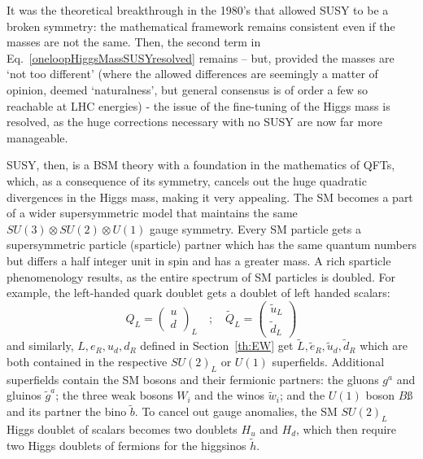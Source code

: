 It was the theoretical breakthrough in the 1980's that allowed \ac{SUSY} to be a broken symmetry: 
the mathematical framework remains consistent even if the masses are not the same.
Then, the second term in Eq.~\ref{oneloopHiggsMassSUSYresolved} remains -- 
but, provided the masses are `not too different' 
(where the allowed differences are seemingly a matter of opinion, deemed `naturalness', but general consensus is of order a few \TeV so reachable at \ac{LHC} energies) 
- the issue of the fine-tuning of the Higgs mass is resolved, as the huge corrections necessary with no \ac{SUSY} are now far more manageable.

\ac{SUSY}, then, is a \ac{BSM} theory with a foundation in the mathematics of \ac{QFT}s, which, as a consequence of its symmetry, cancels out the huge quadratic divergences in the Higgs mass, making it very appealing. 
The \ac{SM} becomes a part of a wider supersymmetric model that maintains the same $SU(3)\otimes SU(2) \otimes U(1)$ gauge symmetry. 
Every \ac{SM} particle gets a supersymmetric particle (sparticle) partner which has the same quantum numbers but differs a half integer unit in spin and has a greater mass. 
A rich sparticle phenomenology results, as the entire spectrum of \ac{SM} particles is doubled.
For example, the left-handed quark doublet gets a doublet of left handed scalars:
\begin{equation}
Q_{L} = \left(  
 \begin{array}{c}
 u \\
 d 
 \end{array} 
 \right)_{L}
 \hspace{1em}; \hspace{1em}
 \tilde{Q}_{L} = \left(  
 \begin{array}{c}
 \tilde{u}_{L} \\
 \tilde{d}_{L} 
 \end{array} 
 \right)
\end{equation}
and similarly, $L, e_{R}, u_{d}, d_{R}$ defined in Section~\ref{th:EW} get $\tilde{L}, \tilde{e}_{R}, \tilde{u}_{d}, \tilde{d}_{R}$ which are both contained in the respective $SU(2)_{L}$ or $U(1)$ superfields.
Additional superfields contain the \ac{SM} bosons and their fermionic partners: the gluons $g^{a}$ and gluinos $\tilde{g}^{a}$; the three weak bosons $W_{i}$ and the winos $\tilde{w}_{i}$; and the $U(1)$ boson $B$ß and its partner the bino $\tilde{b}$. 
To cancel out gauge anomalies, the \ac{SM} $SU(2)_{L}$ Higgs doublet of scalars becomes two doublets $H_{u}$ and $H_{d}$, which then require two Higgs doublets of fermions for the higgsinos $\tilde{h}$. 



